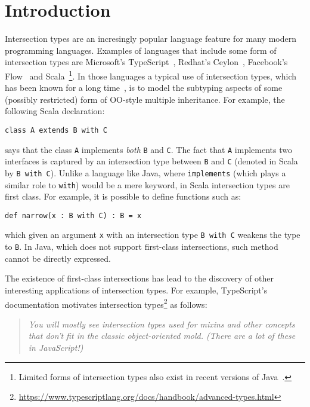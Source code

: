 \section{Introduction}
\label{sec:intro}

Intersection types are an incresingly popular language feature for
many modern programming languages. Examples of languages that 
include some form of intersection types are Microsoft's TypeScript~\cite{}, 
Redhat's Ceylon~\cite{}, Facebook's Flow~\cite{} and
Scala~\cite{}\footnote{Limited forms of intersection types also exist in
recent versions of
Java~\cite{}.}. In those languages a typical use of intersection
types, which has been known for a long time~\cite{}, 
is to model the subtyping aspects of some (possibly restricted) form 
of OO-style multiple inheritance. For example, the following Scala declaration:

\begin{lstlisting}
class A extends B with C
\end{lstlisting}

\noindent says that the class \lstinline{A} implements \emph{both}
\lstinline{B} and \lstinline{C}. The fact that \lstinline{A}
implements two interfaces is captured by an intersection type
between \lstinline{B} and \lstinline{C} (denoted in Scala by
\lstinline{B with C}). Unlike a language like Java, where
\lstinline{implements} (which plays a similar role to
\lstinline{with}) would be a mere keyword, in Scala
intersection types are first class. For example, it is possible to define 
functions such as:

\begin{lstlisting}
def narrow(x : B with C) : B = x
\end{lstlisting}

\noindent which given an argument \lstinline{x} with an intersection
type \lstinline{B with C} weakens the type to \lstinline{B}. 
In Java, which does not support
first-class intersections, such method cannot  
be directly expressed. 

The existence of first-class intersections has lead to the
discovery of other interesting applications of intersection types. 
For example, TypeScript's documentation motivates intersection
types\footnote{\url{https://www.typescriptlang.org/docs/handbook/advanced-types.html}}
as follows:

\begin{quote}
\emph{You will mostly see intersection types used for mixins and other
concepts that don’t fit in the classic object-oriented mold. (There are a lot of these in JavaScript!)}
\end{quote}

